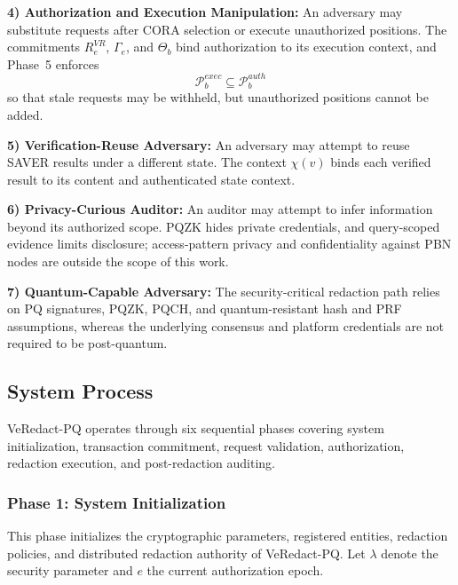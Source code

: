 \documentclass[lettersize,journal]{IEEEtran}
\begin{document}
\textbf{4) Authorization and Execution Manipulation:}
An adversary may substitute requests after CORA selection or execute
unauthorized positions. The commitments $R_e^{VR}$, $\Gamma_e$, and
$\Theta_b$ bind authorization to its execution context, and Phase~5
enforces
\begin{equation}
\mathcal{P}_b^{exec}\subseteq\mathcal{P}_b^{auth}
\label{eq:subset}
\end{equation}
so that stale requests may be withheld, but unauthorized positions
cannot be added.

\textbf{5) Verification-Reuse Adversary:}
An adversary may attempt to reuse SAVER results under a different state.
The context $\chi(v)$ binds each verified result to its content and
authenticated state context.

\textbf{6) Privacy-Curious Auditor:}
An auditor may attempt to infer information beyond its authorized
scope. PQZK hides private credentials, and query-scoped evidence limits
disclosure; access-pattern privacy and confidentiality against PBN
nodes are outside the scope of this work.

\textbf{7) Quantum-Capable Adversary:}
The security-critical redaction path relies on PQ signatures, PQZK,
PQCH, and quantum-resistant hash and PRF assumptions, whereas the
underlying consensus and platform credentials are not required to be
post-quantum.

\subsection{System Process}

VeRedact-PQ operates through six sequential phases covering system
initialization, transaction commitment, request validation, authorization,
redaction execution, and post-redaction auditing.

    
    \subsubsection*{\textbf{Phase 1: System Initialization}}

This phase initializes the cryptographic parameters, registered
entities, redaction policies, and distributed redaction authority of
VeRedact-PQ. Let $\lambda$ denote the security parameter and $e$ the
current authorization epoch.
\end{document}
